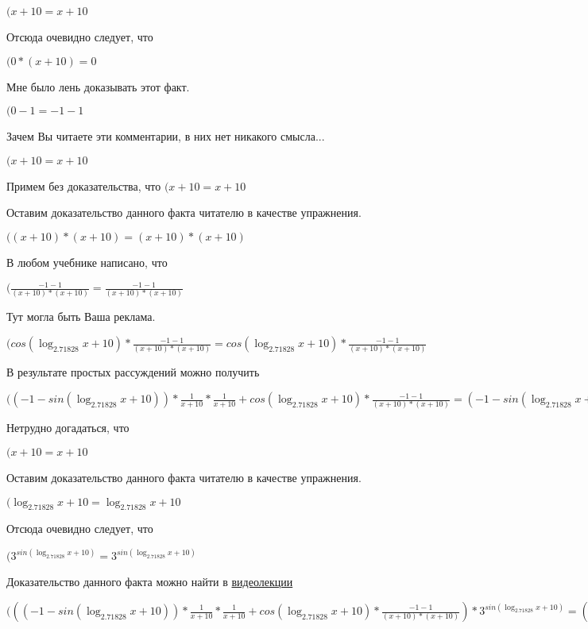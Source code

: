 \documentclass[12pt,a4paper,fleqn]{article}
\theoremstyle{definition}
\begin{document}
$( x  +  10  =  x  +  10 $

Отсюда очевидно следует, что

$( 0  * ( x  +  10 ) =  0 $

Мне было лень доказывать этот факт.

$( 0  -  1  =  -1  -  1 $

Зачем Вы читаете эти комментарии, в них нет никакого смысла...

$( x  +  10  =  x  +  10 $

Примем без доказательства, что
$( x  +  10  =  x  +  10 $

Оставим доказательство данного факта читателю в качестве упражнения.

$(( x  +  10 ) * ( x  +  10 ) = ( x  +  10 ) * ( x  +  10 )$

В любом учебнике написано, что

$(\frac{ -1  -  1 }{( x  +  10 ) * ( x  +  10 )}
 = \frac{ -1  -  1 }{( x  +  10 ) * ( x  +  10 )}
$

Тут могла быть Ваша реклама.

$(cos(\log_{ 2.71828 }{ x  +  10 }) * \frac{ -1  -  1 }{( x  +  10 ) * ( x  +  10 )}
 = cos(\log_{ 2.71828 }{ x  +  10 }) * \frac{ -1  -  1 }{( x  +  10 ) * ( x  +  10 )}
$

В результате простых рассуждений можно получить

$(( -1  - sin(\log_{ 2.71828 }{ x  +  10 })) * \frac{ 1 }{ x  +  10 }
 * \frac{ 1 }{ x  +  10 }
 + cos(\log_{ 2.71828 }{ x  +  10 }) * \frac{ -1  -  1 }{( x  +  10 ) * ( x  +  10 )}
 = ( -1  - sin(\log_{ 2.71828 }{ x  +  10 })) * \frac{ 1 }{ x  +  10 }
 * \frac{ 1 }{ x  +  10 }
 + cos(\log_{ 2.71828 }{ x  +  10 }) * \frac{ -1  -  1 }{( x  +  10 ) * ( x  +  10 )}
$

Нетрудно догадаться, что

$( x  +  10  =  x  +  10 $

Оставим доказательство данного факта читателю в качестве упражнения.

$(\log_{ 2.71828 }{ x  +  10 } = \log_{ 2.71828 }{ x  +  10 }$

Отсюда очевидно следует, что

$({ 3 }^{sin(\log_{ 2.71828 }{ x  +  10 })} = { 3 }^{sin(\log_{ 2.71828 }{ x  +  10 })}$

Доказательство данного факта можно найти в \href{https://www.youtube.com/watch?v=dQw4w9WgXcQ}{видеолекции}

$((( -1  - sin(\log_{ 2.71828 }{ x  +  10 })) * \frac{ 1 }{ x  +  10 }
 * \frac{ 1 }{ x  +  10 }
 + cos(\log_{ 2.71828 }{ x  +  10 }) * \frac{ -1  -  1 }{( x  +  10 ) * ( x  +  10 )}
) * { 3 }^{sin(\log_{ 2.71828 }{ x  +  10 })} = (( -1  - sin(\log_{ 2.71828 }{ x  +  10 })) * \frac{ 1 }{ x  +  10 }
 * \frac{ 1 }{ x  +  10 }
 + cos(\log_{ 2.71828 }{ x  +  10 }) * \frac{ -1  -  1 }{( x  +  10 ) * ( x  +  10 )}
) * { 3 }^{sin(\log_{ 2.71828 }{ x  +  10 })}$
\end{document}
